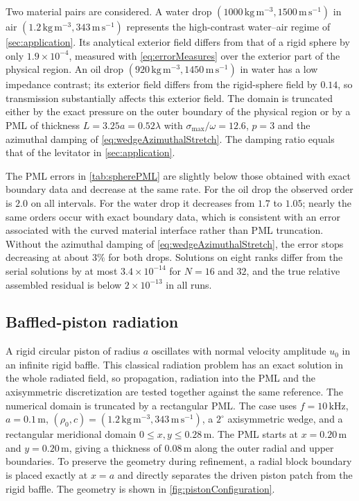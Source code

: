 \documentclass[final,12pt,nopreprintline,longtitle]{elsarticle}
\newcommand{\paperinput}[1]{}
\begin{document}
Two material pairs are considered.  A water drop
$(1000\,\mathrm{kg\,m^{-3}},1500\,\mathrm{m\,s^{-1}})$ in air
$(1.2\,\mathrm{kg\,m^{-3}},343\,\mathrm{m\,s^{-1}})$ represents the
high-contrast water--air regime of \cref{sec:application}.  Its analytical
exterior field differs from that of
a rigid sphere by only $1.9\times10^{-4}$, measured with
\cref{eq:errorMeasures} over the exterior part of the physical region.  An oil
drop $(920\,\mathrm{kg\,m^{-3}},1450\,\mathrm{m\,s^{-1}})$ in water has a low
impedance contrast; its exterior field differs from the rigid-sphere field by
$0.14$, so transmission substantially affects this exterior field.  The
domain is truncated either by the exact pressure on the outer boundary of the
physical region or by a PML of thickness $L=3.25a=0.52\lambda$ with
$\sigma_{\max}/\omega=12.6$, $p=3$ and the azimuthal damping of
\cref{eq:wedgeAzimuthalStretch}.  The damping ratio equals that of the
levitator in \cref{sec:application}.

\paperinput{sphere_pml_table.tex}

The PML errors in \cref{tab:spherePML} are slightly below those obtained
with exact boundary data and decrease at the same rate.  For the oil drop the observed order is $2.0$ on all intervals.  For the
water drop it decreases from $1.7$ to $1.05$; nearly the same orders occur
with exact boundary data, which is consistent with an error associated with
the curved material interface rather than PML truncation.  Without the azimuthal damping of
\cref{eq:wedgeAzimuthalStretch}, the error stops decreasing at about $3\%$ for
both drops.  Solutions on
eight ranks differ from the serial solutions by at most $3.4\times10^{-14}$
for $N=16$ and $32$, and the true relative assembled residual is below
$2\times10^{-13}$ in all runs.

\FloatBarrier
\subsection{Baffled-piston radiation}
\label{sec:piston}

A rigid circular piston of radius $a$ oscillates with normal velocity
amplitude $u_0$ in an infinite rigid baffle.  This classical radiation problem
has an exact solution in the whole radiated field, so propagation, radiation
into the PML and the axisymmetric discretization are tested together against
the same reference.  The numerical domain is truncated by a rectangular PML.
The case uses $f=10\,\mathrm{kHz}$, $a=0.1\,\mathrm{m}$,
$(\rho_0,c)=(1.2\,\mathrm{kg\,m^{-3}},343\,\mathrm{m\,s^{-1}})$, a
$2^\circ$ axisymmetric wedge, and a rectangular meridional domain
$0\leq x,y\leq0.28\,\mathrm{m}$.  The PML starts at $x=0.20\,\mathrm{m}$ and
$y=0.20\,\mathrm{m}$, giving a thickness of $0.08\,\mathrm{m}$ along the outer
radial and upper boundaries.  To preserve the geometry during refinement, a
radial block boundary is placed exactly at $x=a$ and directly separates the
driven piston patch from the rigid baffle.  The geometry is shown in
\cref{fig:pistonConfiguration}.
\end{document}
